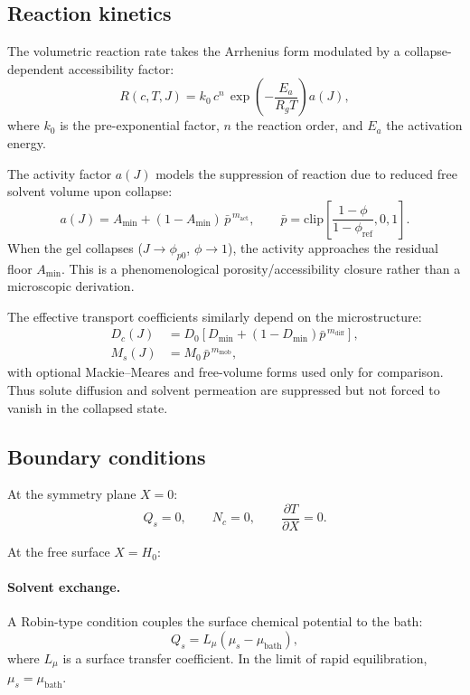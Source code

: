 \documentclass[11pt]{article}
\newcommand{\pp}{\phi_{p0}}
\begin{document}
\subsection{Reaction kinetics}

The volumetric reaction rate takes the Arrhenius form modulated by a collapse-dependent accessibility factor:
\begin{equation}
  R(c,T,J) = k_0\,c^n\,\exp\!\left(-\frac{E_a}{R_g T}\right) a(J),
  \label{eq:R}
\end{equation}
where $k_0$ is the pre-exponential factor, $n$ the reaction order, and $E_a$ the activation energy.

The activity factor $a(J)$ models the suppression of reaction due to reduced free solvent volume upon collapse:
\begin{equation}
  a(J) = A_\mathrm{min}+(1-A_\mathrm{min})\,
  \bar p^{\,m_\mathrm{act}}, \qquad
  \bar p=\mathrm{clip}\!\left[
    \frac{1-\phi}{1-\phi_\mathrm{ref}},0,1\right].
  \label{eq:aJ}
\end{equation}
When the gel collapses ($J\to\pp$, $\phi\to 1$), the activity approaches
the residual floor $A_\mathrm{min}$.  This is a phenomenological
porosity/accessibility closure rather than a microscopic derivation.

The effective transport coefficients similarly depend on the microstructure:
\begin{align}
  D_c(J) &= D_0\left[D_\mathrm{min}+(1-D_\mathrm{min})
  \bar p^{\,m_\mathrm{diff}}\right], \label{eq:Dc} \\
  M_s(J) &= M_0\,\bar p^{\,m_\mathrm{mob}}, \label{eq:Ms}
\end{align}
with optional Mackie--Meares and free-volume forms used only for
comparison.  Thus solute diffusion and solvent permeation are
suppressed but not forced to vanish in the collapsed state.

\subsection{Boundary conditions}

At the symmetry plane $X=0$:
\begin{equation}
  Q_s = 0, \qquad N_c = 0, \qquad \frac{\partial T}{\partial X} = 0.
  \label{eq:bc_sym}
\end{equation}

At the free surface $X=H_0$:

\paragraph{Solvent exchange.}
A Robin-type condition couples the surface chemical potential to the bath:
\begin{equation}
  Q_s = L_\mu\!\left(\mu_s - \mu_\mathrm{bath}\right),
  \label{eq:bc_mu}
\end{equation}
where $L_\mu$ is a surface transfer coefficient. In the limit of rapid equilibration, $\mu_s = \mu_\mathrm{bath}$.
\end{document}
